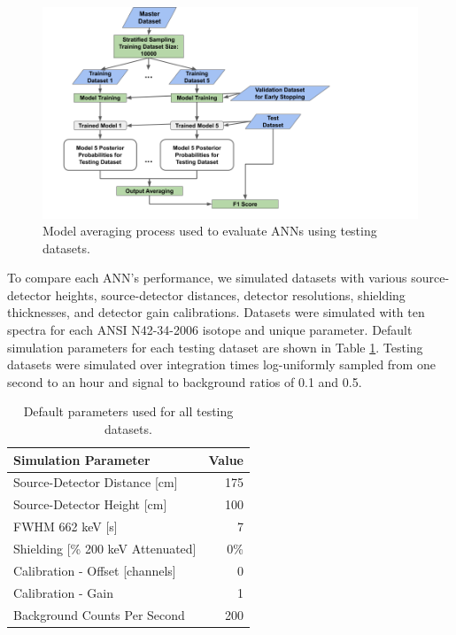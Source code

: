 \begin{figure}[H]
	\centering
	\includegraphics[trim=0 0 210 0,clip,width=1.0\linewidth]{images/generalization_performance_diagram}
	\caption{Model averaging process used to evaluate ANNs using testing datasets.}
	\label{fig:generalization_performance_diagram}
\end{figure}

To compare each ANN's performance, we simulated datasets with various source-detector heights, source-detector distances, detector resolutions, shielding thicknesses, and detector gain calibrations. Datasets were simulated with ten spectra for each ANSI N42-34-2006 isotope and unique parameter. Default simulation parameters for each testing dataset are shown in Table \ref{table:default_sim_params}. Testing datasets were simulated over integration times log-uniformly sampled from one second to an hour and signal to background ratios of 0.1 and 0.5.

\begin{table}[H]
\centering
\caption{Default parameters used for all testing datasets.}
\label{table:default_sim_params}
\begin{tabular}{lr}
\hline
\textbf{Simulation Parameter} &  \textbf{Value} \\ \hline
Source-Detector Distance [cm] & 175\\ 
Source-Detector Height [cm] & 100\\ 
FWHM 662 keV [s] & 7\\ 
Shielding [\% 200 keV Attenuated] & 0\% \\ 
Calibration - Offset [channels] & 0 \\ 
Calibration - Gain & 1 \\ 
Background Counts Per Second & 200 \\ \hline 
\end{tabular}
\end{table}


